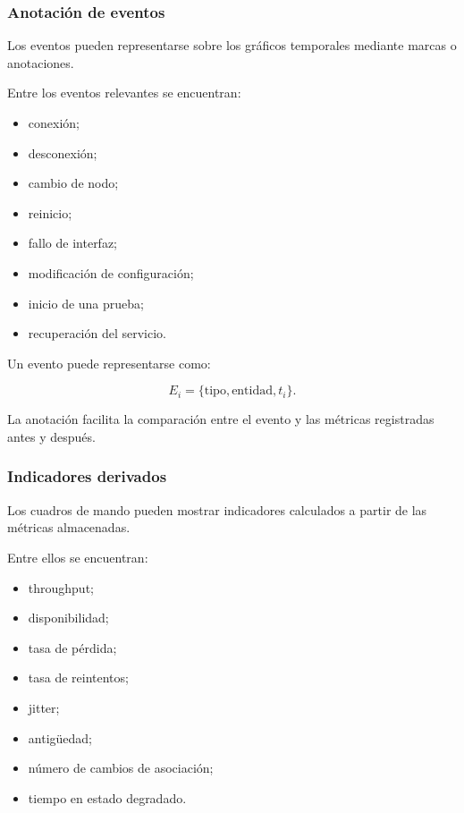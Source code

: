 \subsubsection*{Anotación de eventos}

Los eventos pueden representarse sobre los gráficos temporales mediante
marcas o anotaciones.

Entre los eventos relevantes se encuentran:

\begin{itemize}
    \item conexión;

    \item desconexión;

    \item cambio de nodo;

    \item reinicio;

    \item fallo de interfaz;

    \item modificación de configuración;

    \item inicio de una prueba;

    \item recuperación del servicio.
\end{itemize}

Un evento puede representarse como:

\[
    E_i
    =
    \{
        \text{tipo},
        \text{entidad},
        t_i
    \}.
\]

La anotación facilita la comparación entre el evento y las métricas
registradas antes y después.


\subsubsection*{Indicadores derivados}

Los cuadros de mando pueden mostrar indicadores calculados a partir de
las métricas almacenadas.

Entre ellos se encuentran:

\begin{itemize}
    \item throughput;

    \item disponibilidad;

    \item tasa de pérdida;

    \item tasa de reintentos;

    \item jitter;

    \item antigüedad;

    \item número de cambios de asociación;

    \item tiempo en estado degradado.
\end{itemize}

